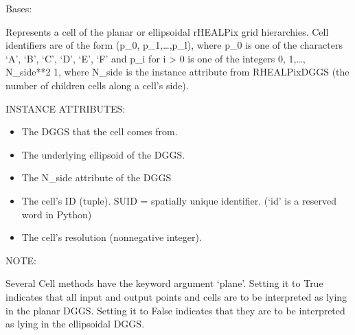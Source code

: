\documentclass[a4paper,12ptopenany,oneside,english]{sphinxmanual}
\begin{document}
\begin{fulllineitems}
\label{\detokenize{dggs:rhealpixdggs.dggs.Cell}}
\pysigstartsignatures
{}
\pysigstopsignatures
\sphinxAtStartPar
Bases: 

\sphinxAtStartPar
Represents a cell of the planar or ellipsoidal rHEALPix grid hierarchies.
Cell identifiers are of the form (p\_0, p\_1,…,p\_l), where p\_0 is one of
the characters ‘A’, ‘B’, ‘C’, ‘D’, ‘E’, ‘F’ and p\_i for i \textgreater{} 0 is one of
the integers 0, 1,…, N\_side**2 \sphinxhyphen{} 1, where N\_side is the instance
attribute from RHEALPixDGGS (the number of children cells along a cell’s
side).

\sphinxAtStartPar
INSTANCE ATTRIBUTES:
\begin{itemize}
\item {} 
\sphinxAtStartPar
{} \sphinxhyphen{} The DGGS that the cell comes from.

\item {} 
\sphinxAtStartPar
{} \sphinxhyphen{} The underlying ellipsoid of the DGGS.

\item {} 
\sphinxAtStartPar
{} \sphinxhyphen{} The N\_side attribute of the DGGS

\item {} 
\sphinxAtStartPar
{} \sphinxhyphen{} The cell’s ID (tuple).  SUID = spatially unique identifier.
(‘id’ is a reserved word in Python)

\item {} 
\sphinxAtStartPar
{} \sphinxhyphen{} The cell’s resolution (nonnegative integer).

\end{itemize}

\sphinxAtStartPar
NOTE:

\sphinxAtStartPar
Several Cell methods have the keyword argument ‘plane’.
Setting it to True indicates that all input and output points and cells are
to be interpreted as lying in the planar DGGS.
Setting it to False indicates that they are to be interpreted as lying in
the ellipsoidal DGGS.


\end{fulllineitems}
\end{document}
